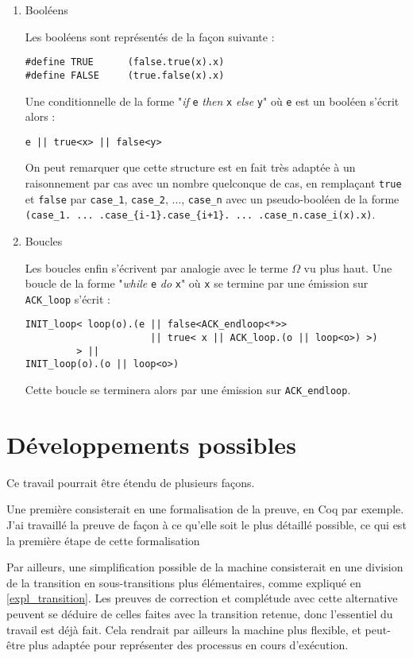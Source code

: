 \documentclass[11pt]{article}
\begin{document}
\begin{enumerate}
\item Booléens
\label{sec-4-2-2-3}

Les booléens sont représentés de la façon suivante :
\begin{verbatim}
#define TRUE      (false.true(x).x)
#define FALSE     (true.false(x).x)
\end{verbatim}

Une conditionnelle de la forme "\emph{if} \verb|e| \emph{then} \verb|x| \emph{else} \verb|y|" où \verb|e| est un booléen s'écrit alors :
\begin{verbatim}
e || true<x> || false<y>
\end{verbatim}

On peut remarquer que cette structure est en fait très adaptée à un raisonnement par cas avec un nombre quelconque de cas, en remplaçant \verb|true| et \verb|false| par \verb|case_1|, \verb|case_2|, ...,  \verb|case_n| avec un pseudo-booléen de la forme
\verb|(case_1. ... .case_{i-1}.case_{i+1}. ... .case_n.case_i(x).x)|.

\item Boucles
\label{sec-4-2-2-4}

Les boucles enfin s'écrivent par analogie avec le terme $\Omega$ vu plus haut.
Une boucle de la forme "\emph{while} \verb|e| \emph{do} \verb|x|" où \verb|x| se termine par une émission sur \verb|ACK_loop| s'écrit :
\begin{verbatim}
INIT_loop< loop(o).(e || false<ACK_endloop<*>>
                      || true< x || ACK_loop.(o || loop<o>) >)
         > ||
INIT_loop(o).(o || loop<o>)
\end{verbatim}
Cette boucle se terminera alors par une émission sur \verb|ACK_endloop|.

\end{enumerate}


\section{Développements possibles}
\label{sec-5}

Ce travail pourrait être étendu de plusieurs façons.

Une première consisterait en une formalisation de la preuve, en Coq par exemple. J'ai travaillé la preuve de façon à ce qu'elle soit le plus détaillé possible, ce qui est la première étape de cette formalisation

Par ailleurs, une simplification possible de la machine consisterait en une division de la transition en sous-transitions plus élémentaires, comme expliqué en \ref{expl_transition}.
Les preuves de correction et complétude avec cette alternative peuvent se déduire de celles faites avec la transition retenue, donc l'essentiel du travail est déjà fait. Cela rendrait par ailleurs la machine plus flexible, et peut-être plus adaptée pour représenter des processus en cours d'exécution.
\end{document}
